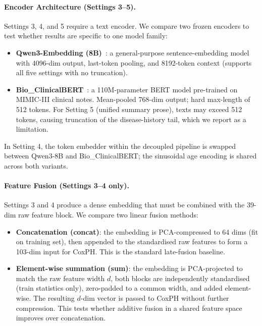 \paragraph{Encoder Architecture (Settings 3--5).}
Settings 3, 4, and 5 require a text encoder.
We compare two frozen encoders to test whether results are specific to one
model family:
\begin{itemize}
  \item \textbf{Qwen3-Embedding (8B)}~\cite{qwen3}: a general-purpose
        sentence-embedding model with 4096-dim output,
        last-token pooling, and 8192-token context (supports all five settings
        with no truncation).
  \item \textbf{Bio\_ClinicalBERT}~\cite{bioclinicalbert}: a 110M-parameter
        BERT model pre-trained on MIMIC-III clinical notes.
        Mean-pooled 768-dim output; hard max-length of 512 tokens.
        For Setting 5 (unified summary prose), texts may exceed 512 tokens,
        causing truncation of the disease-history tail, which we report as a
        limitation.
\end{itemize}
In Setting 4, the token embedder within the decoupled pipeline is swapped
between Qwen3-8B and Bio\_ClinicalBERT; the sinusoidal age encoding is
shared across both variants.

\paragraph{Feature Fusion (Settings 3--4 only).}
Settings 3 and 4 produce a dense embedding that must be combined with the
39-dim raw feature block.
We compare two linear fusion methods:
\begin{itemize}
  \item \textbf{Concatenation (concat)}: the embedding is PCA-compressed
        to 64 dims (fit on training set), then appended to the standardised
        raw features to form a 103-dim input for CoxPH.
        This is the standard late-fusion baseline.
  \item \textbf{Element-wise summation (sum)}: the embedding is
        PCA-projected to match the raw feature width $d$, both blocks are
        independently standardised (train statistics only), zero-padded to a
        common width, and added element-wise.
        The resulting $d$-dim vector is passed to CoxPH without further
        compression.
        This tests whether additive fusion in a shared feature space improves
        over concatenation.
\end{itemize}


